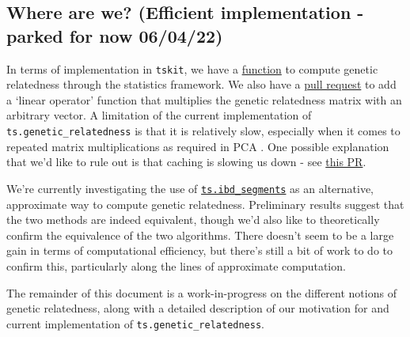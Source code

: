 \subsection*{Where are we? (Efficient implementation - parked for now 06/04/22)}

In terms of implementation in \texttt{tskit}, we have a
\href{https://tskit.dev/tskit/docs/stable/python-api.html#tskit.TreeSequence.genetic_relatedness}{function}
to compute genetic relatedness through the statistics framework.
%
We also have a 
\href{https://github.com/tskit-dev/tskit/pull/1246}{pull request} to add a `linear operator'
function that multiplies the genetic relatedness matrix with an arbitrary vector.
%
A limitation of the current implementation of \texttt{ts.genetic\_relatedness} is that
it is relatively slow, especially when it comes to repeated matrix multiplications as
required in PCA 
.
%
One possible explanation that we'd like to rule out is that caching is slowing us down
- see  \href{https://github.com/tskit-dev/tskit/pull/1937}{this PR}. \smallskip
{}

We're currently investigating the use of \href{https://tskit.dev/tskit/docs/stable/python-api.html#tskit.TreeSequence.ibd_segments}{\texttt{ts.ibd\_segments}}
as an alternative, approximate way to compute genetic relatedness.
%
Preliminary results suggest that the two methods are indeed equivalent,
though we'd also like to theoretically confirm the equivalence of the two algorithms.
%
There doesn't seem to be a large gain in terms of computational efficiency,
but there's still a bit of work to do to confirm this, particularly along
the lines of approximate computation.
%

The remainder of this document is a work-in-progress on the different notions
of genetic relatedness, along with a detailed description of our motivation for
and current implementation of \texttt{ts.genetic\_relatedness}. \smallskip
